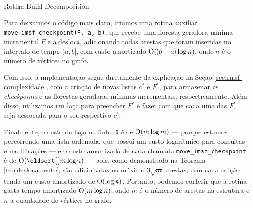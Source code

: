 \begin{algorithm}[h!]
    \caption{Rotina Build Decomposition}\label{rmsf-build-decomp}
    \begin{algorithmic}[1]

         
        \EndIf
        \EndFor

        \State {}

        \EndFor
        \EndFunction
    \end{algorithmic}
\end{algorithm}

Para deixarmos o código mais claro, criamos uma rotina auxiliar \texttt{move\_imsf\_checkpoint(F, a, b)}, que recebe uma floresta geradora mínima incremental $F$ e a desloca, adicionando todas arestas que foram inseridas no intervalo de tempo $(a, b]$, com custo amortizado $\mathrm{O}((b-a) \log n)$, onde $n$ é o número de vértices no grafo.

Com isso, a implementação segue diretamente da explicação na Seção \ref{sec:rmsf-complexidade}, com a criação de novas listas $c^*$ e $F^*$, para armazenar os \emph{checkpoints} e as florestas geradoras mínimas incrementais, respectivamente. Além disso, utilizamos um laço para preencher $F^*$ e fazer com que cada uma das $F^*_i$ seja deslocada para o seu respectivo $c_i^*$.

Finalmente, o custo do laço na linha 6 é de $\mathrm{O}(m \log m)$ --- porque estamos percorrendo uma lista ordenada, que possui um custo logarítmico para consultas e modificações --- e o custo amortizado de cada chamada \texttt{move\_imsf\_checkpoint} é de $\Oh(\sqrt{m} \log n)$ --- pois, como demonstrado no Teorema \ref{teo:deslocamento}, são adicionadas no máximo $3\sqrt{m}$ arestas, com cada adição tendo um custo amortizado de $\mathrm{O}(\log n)$. Portanto, podemos conferir que a rotina gasta tempo amortizado $\mathrm{O}(m \log n)$, onde $m$ é o número de arestas na estrutura e $n$ a quantidade de vértices no grafo.

